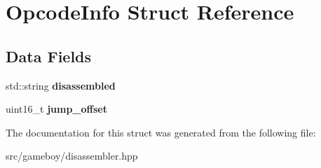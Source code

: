\hypertarget{structOpcodeInfo}{}\section{Opcode\+Info Struct Reference}
\label{structOpcodeInfo}
\subsection*{Data Fields}
\begin{DoxyCompactItemize}
\item 
\mbox{\label{structOpcodeInfo_ad80d1e93494c431c7313342acd628a3b}} 
std\+::string {\bfseries disassembled}
\item 
\mbox{\label{structOpcodeInfo_a78d68eb2466e5570afba30ee539197aa}} 
uint16\+\_\+t {\bfseries jump\+\_\+offset}
\end{DoxyCompactItemize}


The documentation for this struct was generated from the following file\+:\begin{DoxyCompactItemize}
\item 
src/gameboy/disassembler.\+hpp\end{DoxyCompactItemize}
